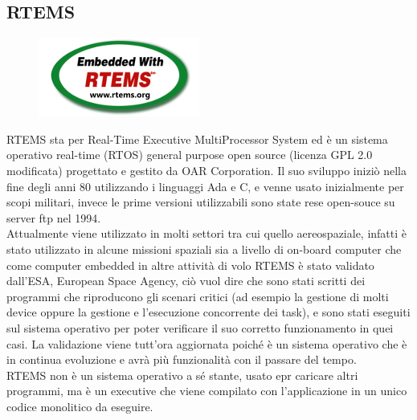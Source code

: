 \documentclass[12pt, a4paper, titlepage, oneside]{book}
\begin{document}
\begin{flushleft}
\section{RTEMS}
\begin{figure}[h]
    \centering
    \includegraphics[scale = 2]{rtemslogo.png}
\end{figure}
RTEMS sta per Real-Time Executive MultiProcessor System ed è un sistema operativo real-time (RTOS) general purpose open source (licenza GPL 2.0 modificata) progettato e gestito da OAR Corporation. Il suo sviluppo iniziò nella fine degli anni 80 utilizzando i linguaggi Ada e C, e venne usato inizialmente per scopi militari, invece le prime versioni utilizzabili sono state rese open-souce su server ftp nel 1994.\\
Attualmente viene utilizzato in molti settori tra cui quello aereospaziale, infatti è stato utilizzato in alcune missioni spaziali sia a livello di on-board computer che come computer embedded in altre attività di volo
RTEMS è  stato validato dall'ESA, European Space Agency, ciò vuol dire che sono stati scritti dei programmi che riproducono gli scenari critici (ad esempio la gestione di molti device oppure la gestione e l'esecuzione concorrente dei task), e sono stati eseguiti sul sistema operativo per poter verificare il suo corretto funzionamento in quei casi. La validazione viene tutt'ora aggiornata poiché è un sistema operativo che è in continua evoluzione e avrà più funzionalità con il passare del tempo.\\
RTEMS non è un sistema operativo a sé stante, usato epr caricare altri programmi, ma è un executive che viene compilato con l'applicazione in un unico codice monolitico da eseguire.


\end{flushleft}
\end{document}
